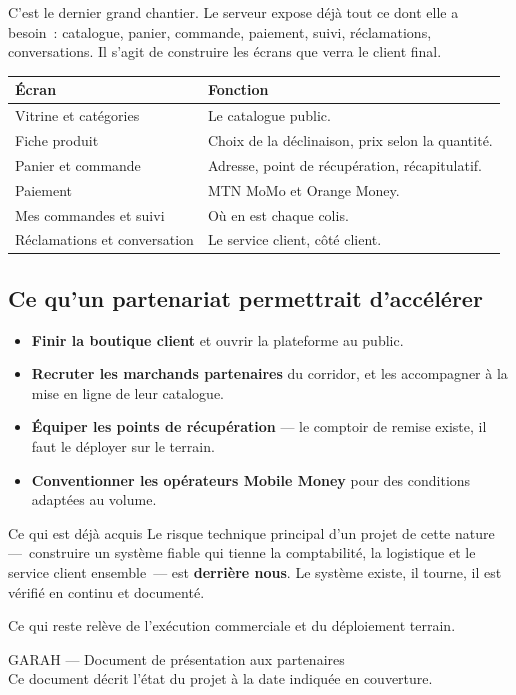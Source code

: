 \documentclass[11pt,a4paper]{article}
\begin{document}
C'est le dernier grand chantier. Le serveur expose déjà tout ce dont elle a
besoin~: catalogue, panier, commande, paiement, suivi, réclamations,
conversations. Il s'agit de construire les écrans que verra le client final.

\begin{center}
\begin{tabularx}{\textwidth}{@{}l>{\raggedright\arraybackslash}X@{}}
\toprule
\textbf{Écran} & \textbf{Fonction} \\
\midrule
Vitrine et catégories & Le catalogue public. \\
Fiche produit & Choix de la déclinaison, prix selon la quantité. \\
Panier et commande & Adresse, point de récupération, récapitulatif. \\
Paiement & MTN MoMo et Orange Money. \\
Mes commandes et suivi & Où en est chaque colis. \\
Réclamations et conversation & Le service client, côté client. \\
\bottomrule
\end{tabularx}
\end{center}

\subsection{Ce qu'un partenariat permettrait d'accélérer}

\begin{itemize}
  \item \textbf{Finir la boutique client} et ouvrir la plateforme au public.
  \item \textbf{Recruter les marchands partenaires} du corridor, et les
        accompagner à la mise en ligne de leur catalogue.
  \item \textbf{Équiper les points de récupération} — le comptoir de remise
        existe, il faut le déployer sur le terrain.
  \item \textbf{Conventionner les opérateurs Mobile Money} pour des conditions
        adaptées au volume.
\end{itemize}

\vspace{1.5em}
\begin{encadre}{Ce qui est déjà acquis}
Le risque technique principal d'un projet de cette nature —~construire un
système fiable qui tienne la comptabilité, la logistique et le service
client ensemble~— est \textbf{derrière nous}. Le système existe, il tourne,
il est vérifié en continu et documenté.

Ce qui reste relève de l'exécution commerciale et du déploiement terrain.
\end{encadre}

\vfill
\begin{center}
\color{gris}\small
GARAH — Document de présentation aux partenaires \\
Ce document décrit l'état du projet à la date indiquée en couverture.
\end{center}
\end{document}
